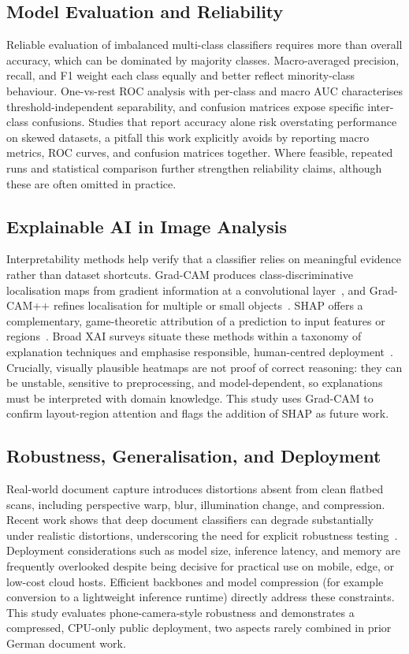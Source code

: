 \documentclass[preprint,12pt]{elsarticle}
\begin{document}
\subsection{Model Evaluation and Reliability}
Reliable evaluation of imbalanced multi-class classifiers requires more than
overall accuracy, which can be dominated by majority classes.
Macro-averaged precision, recall, and F1 weight each class equally and better
reflect minority-class behaviour.
One-vs-rest ROC analysis with per-class and macro AUC characterises
threshold-independent separability, and confusion matrices expose specific
inter-class confusions.
Studies that report accuracy alone risk overstating performance on skewed
datasets, a pitfall this work explicitly avoids by reporting macro metrics, ROC
curves, and confusion matrices together.
Where feasible, repeated runs and statistical comparison further strengthen
reliability claims, although these are often omitted in practice.

\subsection{Explainable AI in Image Analysis}
Interpretability methods help verify that a classifier relies on meaningful
evidence rather than dataset shortcuts.
Grad-CAM produces class-discriminative localisation maps from gradient
information at a convolutional layer~\cite{selvaraju2017grad}, and Grad-CAM++
refines localisation for multiple or small objects~\cite{chattopadhay2018grad}.
SHAP offers a complementary, game-theoretic attribution of a prediction to input
features or regions~\cite{lundberg2017unified}.
Broad XAI surveys situate these methods within a taxonomy of explanation
techniques and emphasise responsible, human-centred
deployment~\cite{arrieta2020explainable}.
Crucially, visually plausible heatmaps are not proof of correct reasoning: they
can be unstable, sensitive to preprocessing, and model-dependent, so explanations
must be interpreted with domain knowledge.
This study uses Grad-CAM to confirm layout-region attention and flags the
addition of SHAP as future work.

\subsection{Robustness, Generalisation, and Deployment}
Real-world document capture introduces distortions absent from clean flatbed
scans, including perspective warp, blur, illumination change, and compression.
Recent work shows that deep document classifiers can degrade substantially under
realistic distortions, underscoring the need for explicit robustness
testing~\cite{saifullah2022robust}.
Deployment considerations such as model size, inference latency, and memory are
frequently overlooked despite being decisive for practical use on mobile, edge,
or low-cost cloud hosts.
Efficient backbones and model compression (for example conversion to a
lightweight inference runtime) directly address these constraints.
This study evaluates phone-camera-style robustness and demonstrates a compressed,
CPU-only public deployment, two aspects rarely combined in prior German document
work.
\end{document}
